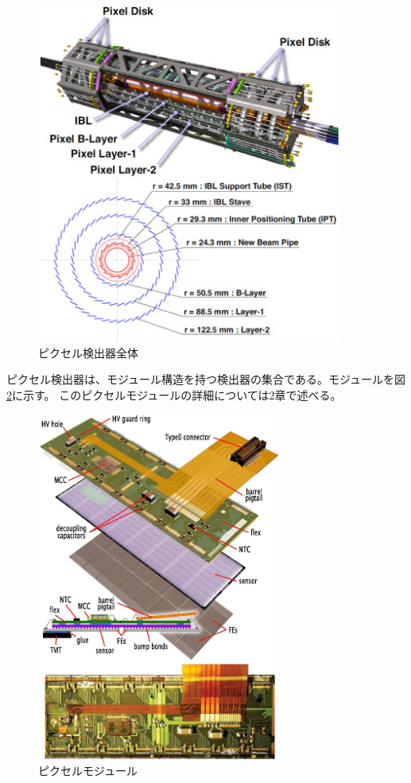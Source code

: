 \begin{figure}[bpt]\centering
\includegraphics[width=10cm]{pixel_detector_overview}
\caption[ピクセル検出器全体]{ピクセル検出器全体\cite{1-5}}
\label{pixel_detector_overview}
\end{figure}

ピクセル検出器は、モジュール構造を持つ検出器の集合である。モジュールを図\ref{pixel_detector}に示す。
このピクセルモジュールの詳細については2章で述べる。
\begin{figure}[bpt]\centering
\includegraphics[width=8cm]{pixel_detector}
\caption[ピクセルモジュール]{ピクセルモジュール\cite{1-2}}
\label{pixel_detector}
\end{figure}


